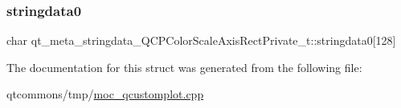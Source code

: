 \subsubsection{\texorpdfstring{stringdata0}{stringdata0}}
{\footnotesize\ttfamily char qt\+\_\+meta\+\_\+stringdata\+\_\+\+Q\+C\+P\+Color\+Scale\+Axis\+Rect\+Private\+\_\+t\+::stringdata0\mbox{[}128\mbox{]}}



The documentation for this struct was generated from the following file\+:\begin{DoxyCompactItemize}
\item 
qtcommons/tmp/\mbox{\hyperlink{moc__qcustomplot_8cpp}{moc\+\_\+qcustomplot.\+cpp}}\end{DoxyCompactItemize}
